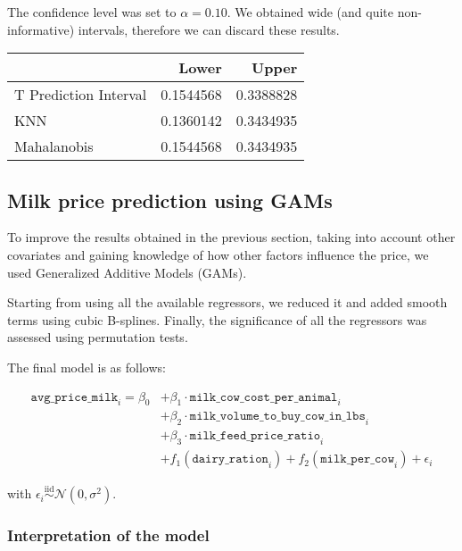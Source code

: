 
The confidence level was set to $\alpha=0.10$. We obtained wide (and quite non-informative) intervals, therefore we can discard these results.

\begin{table}[H]
    \centering
    \begin{tabular}{lrr}
    \toprule
      & Lower & Upper\\
    \midrule
    T Prediction Interval & 0.1544568 & 0.3388828\\
    KNN & 0.1360142 & 0.3434935\\
    Mahalanobis & 0.1544568 & 0.3434935\\
    \bottomrule
    \end{tabular}
\end{table}

\subsection{Milk price prediction using GAMs}
To improve the results obtained in the previous section, taking into account other covariates and gaining knowledge of how other factors influence the price, we used Generalized Additive Models (GAMs).

Starting from using all the available regressors, we reduced it and added smooth terms using cubic B-splines. Finally, the significance of all the regressors was assessed using permutation tests.

The final model is as follows:

\begin{equation}
    \label{eq:gam}
    \begin{aligned}
    \texttt{avg\_price\_milk}_i  =  \beta_0 &+ \beta_1 \cdot \texttt{milk\_cow\_cost\_per\_animal}_i \\
                        &+ \beta_2 \cdot \texttt{milk\_volume\_to\_buy\_cow\_in\_lbs}_i\\
                        &+ \beta_3 \cdot \texttt{milk\_feed\_price\_ratio}_i \\
                        &+ f_1(\texttt{dairy\_ration}_i) + f_2(\texttt{milk\_per\_cow}_i) + \epsilon_i
    \end{aligned}
\end{equation}

with $\epsilon_i \stackrel{\text{iid}}{\sim} \mathcal{N}(0,\sigma^{2})$.

\subsubsection{Interpretation of the model}

